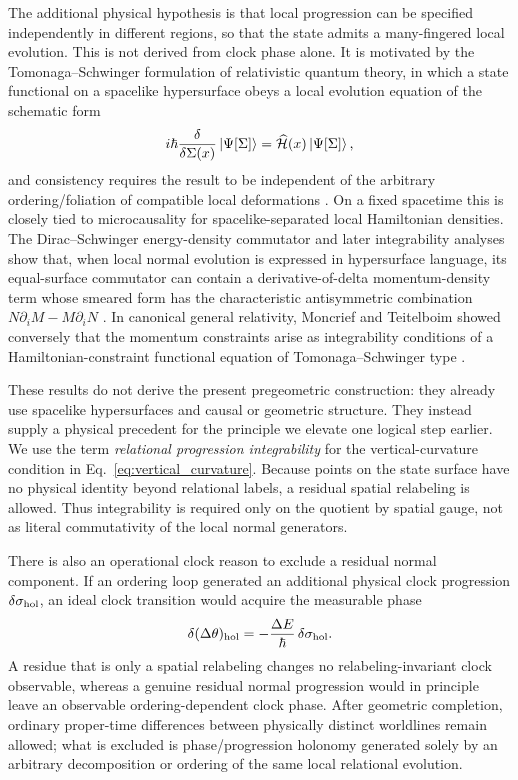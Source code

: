\documentclass[11pt]{article}
\begin{document}
The additional physical hypothesis is that local progression can be specified independently in different regions, so that the state admits a many-fingered local evolution. This is not derived from clock phase alone. It is motivated by the Tomonaga--Schwinger formulation of relativistic quantum theory, in which a state functional on a spacelike hypersurface obeys a local evolution equation of the schematic form
\begin{equation}
    i\hbar\frac{\delta}{\delta\Sigma(x)}\ket{\Psi[\Sigma]}
    =\widehat{\mathcal H}(x)\ket{\Psi[\Sigma]},
    \label{eq:TS_equation}
\end{equation}
and consistency requires the result to be independent of the arbitrary ordering/foliation of compatible local deformations \cite{Tomonaga1946,Schwinger1948}. On a fixed spacetime this is closely tied to microcausality for spacelike-separated local Hamiltonian densities. The Dirac--Schwinger energy-density commutator and later integrability analyses show that, when local normal evolution is expressed in hypersurface language, its equal-surface commutator can contain a derivative-of-delta momentum-density term whose smeared form has the characteristic antisymmetric combination $N\partial_iM-M\partial_iN$ \cite{Schwinger1963,Fukuyama1973}. In canonical general relativity, Moncrief and Teitelboim showed conversely that the momentum constraints arise as integrability conditions of a Hamiltonian-constraint functional equation of Tomonaga--Schwinger type \cite{MoncriefTeitelboim1972}.

These results do not derive the present pregeometric construction: they already use spacelike hypersurfaces and causal or geometric structure. They instead supply a physical precedent for the principle we elevate one logical step earlier. We use the term \emph{relational progression integrability} for the vertical-curvature condition in Eq.~\eqref{eq:vertical_curvature}. Because points on the state surface have no physical identity beyond relational labels, a residual spatial relabeling is allowed. Thus integrability is required only on the quotient by spatial gauge, not as literal commutativity of the local normal generators.

There is also an operational clock reason to exclude a residual normal component. If an ordering loop generated an additional physical clock progression $\delta\sigma_{\rm hol}$, an ideal clock transition would acquire the measurable phase
\begin{equation}
    \delta(\Delta\theta)_{\rm hol}
    =-\frac{\Delta E}{\hbar}\,\delta\sigma_{\rm hol}.
    \label{eq:clock_holonomy}
\end{equation}
A residue that is only a spatial relabeling changes no relabeling-invariant clock observable, whereas a genuine residual normal progression would in principle leave an observable ordering-dependent clock phase. After geometric completion, ordinary proper-time differences between physically distinct worldlines remain allowed; what is excluded is phase/progression holonomy generated solely by an arbitrary decomposition or ordering of the same local relational evolution.
\end{document}
